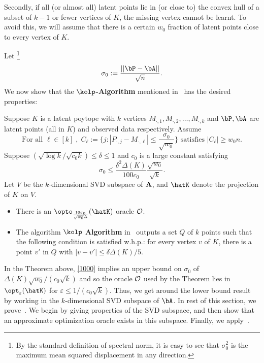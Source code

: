 Secondly, if all (or almost all) latent points lie in (or close to) the convex hull of a subset of $k-1$ or fewer vertices of $K$, the missing vertex cannot be learnt. To avoid this, we will assume that there is a certain $w_0$ fraction of latent points close to every vertex of $K$. 

Let \footnote{By the standard definition of spectral norm, it is easy to see that $\sigma_0^2$ is the maximum mean squared displacement in any direction.}
\begin{equation}
\label{eq:p}
\sigma_0 :=\frac{||\bP-\bA||}{\sqrt n}.
\end{equation}
We now show that the {\bf $\kolp$-Algorithm} mentioned in~
has the desired properties: 
\begin{theorem}\label{LkP-Main-Thm}
Suppose $K$ is a latent poytope with $k$ vertices $M_{\cdot,1},M_{\cdot,2},\ldots ,M_{\cdot, k}$ and $\bP,\bA$ are latent points (all in $K$) and observed data respectively. Assume 
\begin{equation}\label{eq:cell}
\mbox{For all }\ell\in[k]\; ,\; C_\ell :=\{j:|P_{\cdot,j}-M_{\cdot,\ell}|\leq\frac{\sigma_0}{\sqrt{w_0}}\} \mbox{ satisfies    }
|C_\ell|\geq w_0n.
\end{equation}
Suppose $(\sqrt{\log k}/\sqrt{c_0k})\leq \delta\leq 1$ and $c_0$ is a large constant satisfying
\begin{equation}\label{1000}
\sigma_0\leq \frac{\delta^2\Delta(K)}{100c_0}\frac{\sqrt{w_0}}{\sqrt k}.
\end{equation}
Let $V$ be the $k$-dimensional SVD subspace of $\bf A$, and $\hatK$ denote the projection of $K$ on $V$. 
\begin{itemize}
    \item There is an $ \opto_{\frac{10\sigma_0}{\sqrt{w_0}\Delta}}(\hatK)$ oracle $\cal O$. 
    \item The algorithm {\bf $\kolp$ Algorithm} in~ outputs a set $Q$ of $k$ points such that the following condition is satisfied w.h.p.:  for every vertex $v$ of $K$, there is a point $v'$ in $Q$ with $|v-v'| \leq \delta \Delta(K)/5$. 
\end{itemize}
\end{theorem}

In the Theorem above, \eqref{1000}  implies an upper bound on $\sigma_0$ of $\Delta(K)\sqrt{w_0}/(c_0\sqrt k)$ and so the  oracle $\cal O$ used by the Theorem lies in $\opt_\varepsilon(\hatK)$ for  $\varepsilon\leq 1/(c_0\sqrt k)$. Thus, we get around the lower bound result~ by working in the $k$-dimensional SVD subspace of $\bA$. In rest of this section, we prove~. We begin by giving properties of the SVD subspace, and then show that an approximate optimization oracle exists in this subspace. Finally, we apply~.



